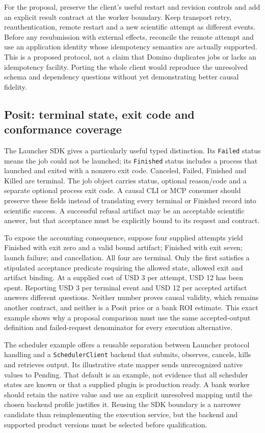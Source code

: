 For the proposal, preserve the client's useful restart and revision controls
and add an explicit result contract at the worker boundary. Keep transport
retry, reauthentication, remote restart and a new scientific attempt as
different events. Before any resubmission with external effects, reconcile
the remote attempt and use an application identity whose idempotency
semantics are actually supported. This is a proposed protocol, not a claim
that Domino duplicates jobs or lacks an idempotency facility. Porting the
whole client would reproduce the unresolved schema and dependency questions
without yet demonstrating better causal fidelity.

\subsection{Posit: terminal state, exit code and conformance coverage}

The Launcher SDK gives a particularly useful typed distinction. Its
\texttt{Failed} status means the job could not be launched; its
\texttt{Finished} status includes a process that launched and exited with
a nonzero exit code. Canceled, Failed, Finished and Killed are terminal.
The job object carries status, optional reason/code and a separate optional
process exit code. A causal CLI or MCP consumer should preserve these fields
instead of translating every terminal or Finished record into scientific
success. A successful refusal artifact may be an acceptable scientific
answer, but that acceptance must be explicitly bound to its request and
contract.
\citep{exec23_workflow_delegates_positgo}

To expose the accounting consequence, suppose four supplied attempts yield
Finished with exit zero and a valid bound artifact; Finished with exit seven;
launch failure; and cancellation. All four are terminal. Only the first
satisfies a stipulated acceptance predicate requiring the allowed state,
allowed exit and artifact binding. At a supplied cost of USD 3 per attempt,
USD 12 has been spent. Reporting USD 3 per terminal event and USD 12 per
accepted artifact answers different questions. Neither number proves causal
validity, which remains another contract, and neither is a Posit price or a
bank ROI estimate. This exact example shows why a proposal comparison must
use the same accepted-output definition and failed-request denominator for
every execution alternative.
\citep{exec23_workflow_delegates_reference}

The scheduler example offers a reusable separation between Launcher protocol
handling and a \texttt{SchedulerClient} backend that submits, observes,
cancels, kills and retrieves output. Its illustrative state mapper sends
unrecognized native values to Pending. That default is an example, not
evidence that all scheduler states are known or that a supplied plugin is
production ready. A bank worker should retain the native value and use an
explicit unresolved mapping until the chosen backend profile justifies it.
Reusing the SDK boundary is a narrower candidate than reimplementing the
execution service, but the backend and supported product versions must be
selected before qualification.
\citep{exec23_workflow_delegates_positgo}


